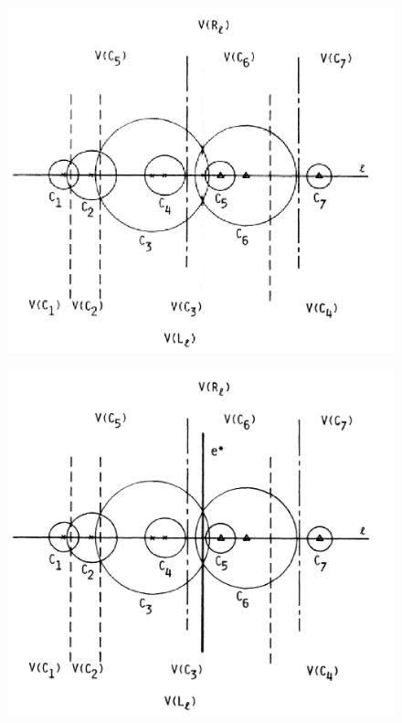 \documentclass[12pt]{article}
\begin{document}
\begin{CJK}{UTF8}{bkai}
\begin{figure}[h]
\includegraphics[scale=0.4]{figure9.eps}
\caption{}
\end{figure}

\begin{figure}[h]
\includegraphics[scale=0.4]{figure5(iv).eps}
\caption{}
\end{figure}


\end{CJK}
\end{document}
